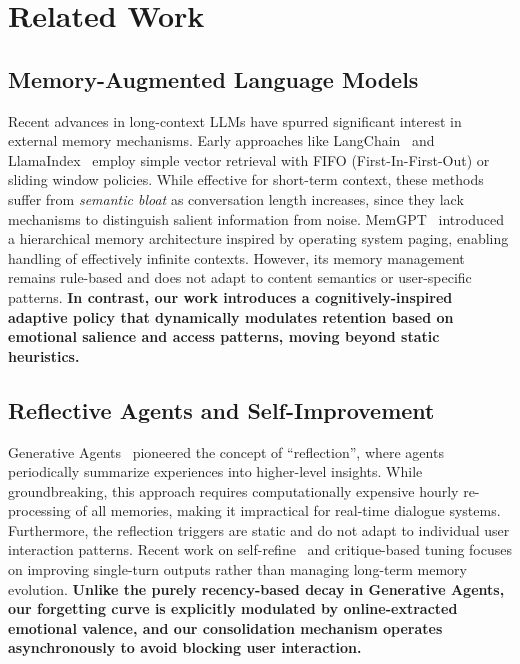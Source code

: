 \section{Related Work}
\label{sec:related_work}

\subsection{Memory-Augmented Language Models}
Recent advances in long-context LLMs have spurred significant interest in external memory mechanisms. Early approaches like LangChain~\cite{langchain} and LlamaIndex~\cite{llamaindex} employ simple vector retrieval with FIFO (First-In-First-Out) or sliding window policies. While effective for short-term context, these methods suffer from \textit{semantic bloat} as conversation length increases, since they lack mechanisms to distinguish salient information from noise. MemGPT~\cite{memgpt} introduced a hierarchical memory architecture inspired by operating system paging, enabling handling of effectively infinite contexts. However, its memory management remains rule-based and does not adapt to content semantics or user-specific patterns. \textbf{In contrast, our work introduces a cognitively-inspired adaptive policy that dynamically modulates retention based on emotional salience and access patterns, moving beyond static heuristics.}

\subsection{Reflective Agents and Self-Improvement}
Generative Agents~\cite{generative_agents} pioneered the concept of ``reflection'', where agents periodically summarize experiences into higher-level insights. While groundbreaking, this approach requires computationally expensive hourly re-processing of all memories, making it impractical for real-time dialogue systems. Furthermore, the reflection triggers are static and do not adapt to individual user interaction patterns. Recent work on self-refine~\cite{selfrefine} and critique-based tuning focuses on improving single-turn outputs rather than managing long-term memory evolution. \textbf{Unlike the purely recency-based decay in Generative Agents, our forgetting curve is explicitly modulated by online-extracted emotional valence, and our consolidation mechanism operates asynchronously to avoid blocking user interaction.}

